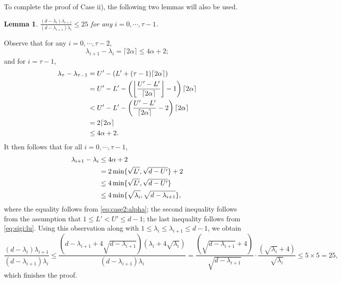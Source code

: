 \documentclass[onecolumn,letterpaper]{IEEEtran}
\newtheorem{lemma}{Lemma}
\newcommand{\up}{{U}}
\newcommand{\lw}{{L}}
\newcommand{\ap}{{\alpha}}
\newcommand{\exi}{{i}}
\newcommand{\sig}{{\lambda}}
\newcommand{\sigi}{{\sig_{\exi}}}
\newcommand{\sigio}{{\sig_{\exi+1}}}
\newcommand{\sigt}{{\sig_{\ta}}}
\newcommand{\sigto}{{\sig_{\ta-1}}}
\newcommand{\ta}{{\tau}}
\newcommand{\alp}{{\ap}}
\begin{document}
To complete the proof of Case ii), the following two lemmas will also be used.
\begin{lemma} 
\label{lem:exi:alp_dif}
$\frac{(d-\sigi)\sigio}{(d-\sigio)\sigi} \le 25$ for any $\exi = 0,\cdots, \ta-1$.  
\end{lemma}
\begin{IEEEproof}
Observe that for any $ \exi = 0,\cdots,\ta-2$, 
\begin{equation}
    \sigio - \sigi = \lceil 2\alp \rceil \leq 4\alp+2;
\end{equation}
and for $\exi = \ta-1$, 
\begin{align}
    \sigt-\sigto &= \up' - (\lw'+(\ta-1)\lceil2\alp\rceil) \notag\\ 
    &= \up' - \lw' - \left( \left\lfloor \frac{\up'-\lw'}{\lceil2\alp\rceil} \right\rfloor - 1 \right) \lceil 2\alp \rceil \notag\\ 
    &< \up' - \lw' - \left( \frac{\up'-\lw'}{\lceil2\alp\rceil} - 2 \right) \lceil 2\alp \rceil \notag\\ 
    &= 2 \lceil 2\alp \rceil \notag\\ 
    &\leq 4\alp + 2.
\end{align}
It then follows that for all $ \exi = 0,\cdots,\ta-1$,
\begin{align}
    \sigio - \sigi &\leq 4\alp + 2 \notag\\ 
    &= 2 \min\{\sqrt{\lw'} , \sqrt{d-\up'}\} + 2 \notag\\ 
    &\le 4 \min\{\sqrt{\lw'} , \sqrt{d-\up'}\} \notag\\ 
    &\le 4 \min\{\sqrt{\sigi} , \sqrt{d-\sigio}\},
\end{align}
where the equality follows from \eqref{eq:case2:alpha}; the second inequality follows from the assumption that $ 1 \le \lw' < \up' \le d-1$; the last inequality follows from \eqref{eq:sigi:lu}.
Using this observation along with $ 1 \leq \sigi\leq \sigio \leq d-1$, we obtain 
\begin{equation}
    \frac{(d-\sigi)\sigio}{(d-\sigio)\sigi} \leq \frac{(d-\sigio+4\sqrt{d-\sigio}) (\sigi+4\sqrt{\sigi})}{(d-\sigio)\sigi}=  \frac{(\sqrt{d-\sigio}+4)}{\sqrt{d-\sigio}}\cdot\frac {(\sqrt{\sigi}+4)}{\sqrt{\sigi}}\le 5\times 5=25,
\end{equation}
which finishes the proof.
\end{IEEEproof}
\end{document}
